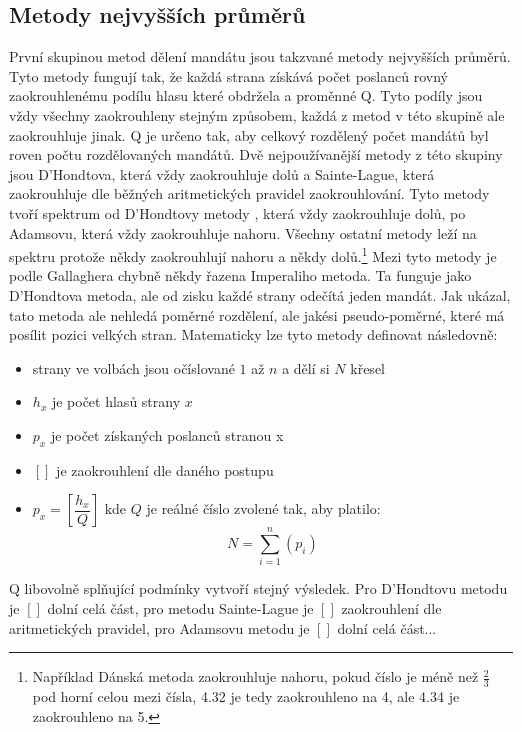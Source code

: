 \documentclass[12pt]{report}
\begin{document}
\subsection{Metody nejvyšších průměrů}
První skupinou metod dělení mandátu jsou takzvané metody nejvyšších průměrů.
Tyto metody fungují tak, že každá strana získává počet poslanců rovný zaokrouhlenému podílu hlasu které obdržela a proměnné Q.
Tyto podíly jsou vždy všechny zaokrouhleny stejným způsobem, každá z metod v této skupině ale zaokrouhluje jinak.
Q je určeno tak, aby celkový rozdělený počet mandátů byl roven počtu rozdělovaných mandátů.
Dvě nejpoužívanější metody z této skupiny jsou D'Hondtova, která vždy zaokrouhluje dolů a Sainte-Lague, která zaokrouhluje dle běžných aritmetických pravidel zaokrouhlování.
Tyto metody tvoří spektrum od D'Hondtovy metody , která vždy zaokrouhluje dolů, po Adamsovu, která vždy zaokrouhluje nahoru.
Všechny ostatní metody leží na spektru protože někdy zaokrouhlují nahoru a někdy dolů.\footnote{Například Dánská metoda zaokrouhluje nahoru, pokud číslo je méně než $\frac{2}{3}$ pod horní celou mezi čísla, 4.32 je tedy zaokrouhleno na 4, ale 4.34 je zaokrouhleno na 5.}
Mezi tyto metody je podle Gallaghera chybně někdy řazena Imperaliho metoda.
Ta funguje jako D'Hondtova metoda, ale od zisku každé strany odečítá jeden mandát.
Jak ukázal, tato metoda ale nehledá poměrné rozdělení, ale jakési pseudo-poměrné, které má posílit pozici velkých stran.\autocite{GAL1}
\newpage
Matematicky lze tyto metody definovat následovně: 
\begin{itemize}
\item strany ve volbách jsou očíslované $1$ až $n$ a dělí si $N$ křesel
\item $h_{x}$ je počet hlasů strany $x$ \item $p_{x}$ je počet získaných poslanců stranou x
\item $[ ]$ je zaokrouhlení dle daného postupu
\item $p_{x}=\left[\dfrac{h_{x}}{Q}\right]$ kde $Q$ je reálné číslo zvolené tak, aby platilo: $$N=\sum_{i=1}^{n} (p_{i})$$
\end{itemize}
Q libovolně splňující podmínky vytvoří stejný výsledek.\autocite{GAL1}
Pro D'Hondtovu metodu je $[ ]$ dolní celá část, pro metodu Sainte-Lague je $[ ]$ zaokrouhlení dle aritmetických pravidel, pro Adamsovu metodu je $[ ]$ dolní celá část...
\end{document}
